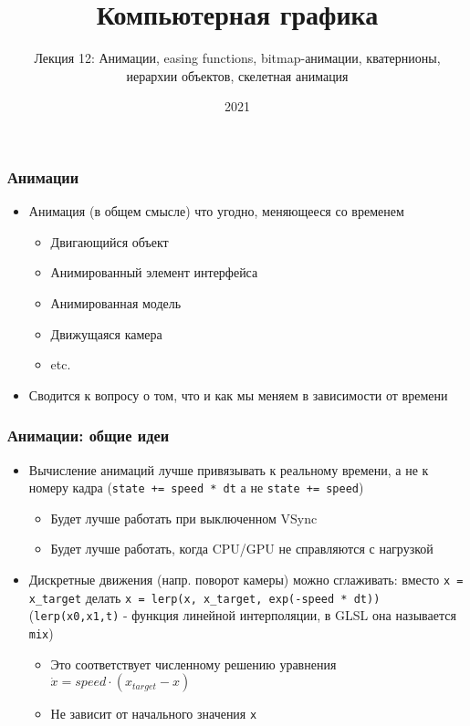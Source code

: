 \documentclass{beamer}
\title{Компьютерная графика}
\subtitle{Лекция 12: Анимации, easing functions, bitmap-анимации, кватернионы, иерархии объектов, скелетная анимация}
\date{2021}
\begin{document}
\frame{\titlepage}

\begin{frame}[fragile]
\frametitle{Анимации}
\begin{itemize}
\item Анимация (в общем смысле) \textendash{} что угодно, меняющееся со временем
\pause
\begin{itemize}
\item Двигающийся объект
\item Анимированный элемент интерфейса
\item Анимированная модель
\item Движущаяся камера
\item etc.
\end{itemize}
\pause
\item Сводится к вопросу о том, что и как мы меняем в зависимости от времени
\end{itemize}
\end{frame}

\begin{frame}[fragile]
\frametitle{Анимации: общие идеи}
\begin{itemize}
\item Вычисление анимаций лучше привязывать к реальному времени, а не к номеру кадра (\verb|state += speed * dt| а не \verb|state += speed|)
\pause
\begin{itemize}
\item Будет лучше работать при выключенном VSync
\item Будет лучше работать, когда CPU/GPU не справляются с нагрузкой
\end{itemize}
\pause
\item Дискретные движения (напр. поворот камеры) можно сглаживать: вместо \verb|x = x_target| делать \verb|x = lerp(x, x_target, exp(-speed * dt))| (\verb|lerp(x0,x1,t)| - функция линейной интерполяции, в GLSL она называется \verb|mix|)
\pause
\begin{itemize}
\item Это соответствует численному решению уравнения \begin{math}\dot x = speed \cdot (x_{target} - x)\end{math}
\item Не зависит от начального значения \verb|x|
\end{itemize}
\end{itemize}
\end{frame}
\end{document}
